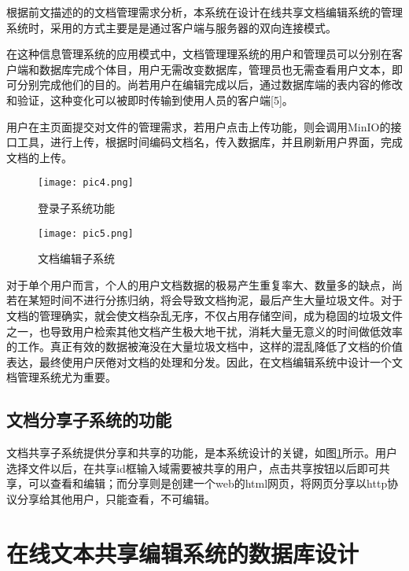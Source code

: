 \documentclass[forprint]{software}
\begin{document}
根据前文描述的的文档管理需求分析，本系统在设计在线共享文档编辑系统的管理系统时，采用的方式主要是是通过客户端与服务器的双向连接模式。

在这种信息管理系统的应用模式中，文档管理理系统的用户和管理员可以分别在客户端和数据库完成个体目，用户无需改变数据库，管理员也无需查看用户文本，即可分别完成他们的目的。尚若用户在编辑完成以后，通过数据库端的表内容的修改和验证，这种变化可以被即时传输到使用人员的客户端[5]。

用户在主页面提交对文件的管理需求，若用户点击上传功能，则会调用MinIO的接口工具，进行上传，根据时间编码文档名，传入数据库，并且刷新用户界面，完成文档的上传。

\begin{figure}[ht]
	\centering
	\begin{minipage}[t]{0.45\linewidth}
		\centering
		\texttt{[image: pic4.png]}
		\caption{登录子系统功能}
		\label{fig:4}
	\end{minipage}%
	\begin{minipage}[t]{0.45\linewidth}
		\centering
		\texttt{[image: pic5.png]}
		\caption{文档编辑子系统}
		\label{fig:5}
	\end{minipage}%
\end{figure}

对于单个用户而言，个人的用户文档数据的极易产生重复率大、数量多的缺点，尚若在某短时间不进行分拣归纳，将会导致文档拘泥，最后产生大量垃圾文件。对于文档的管理确实，就会使文档杂乱无序，不仅占用存储空间，成为稳固的垃圾文件之一，也导致用户检索其他文档产生极大地干扰，消耗大量无意义的时间做低效率的工作。真正有效的数据被淹没在大量垃圾文档中，这样的混乱降低了文档的价值表达，最终使用户厌倦对文档的处理和分发。因此，在文档编辑系统中设计一个文档管理系统尤为重要。

\section{文档分享子系统的功能}

文档共享子系统提供分享和共享的功能，是本系统设计的关键，如图\ref{fig:5}所示。用户选择文件以后，在共享id框输入域需要被共享的用户，点击共享按钮以后即可共享，可以查看和编辑；而分享则是创建一个web的html网页，将网页分享以http协议分享给其他用户，只能查看，不可编辑。

\chapter{在线文本共享编辑系统的数据库设计}
\end{document}
